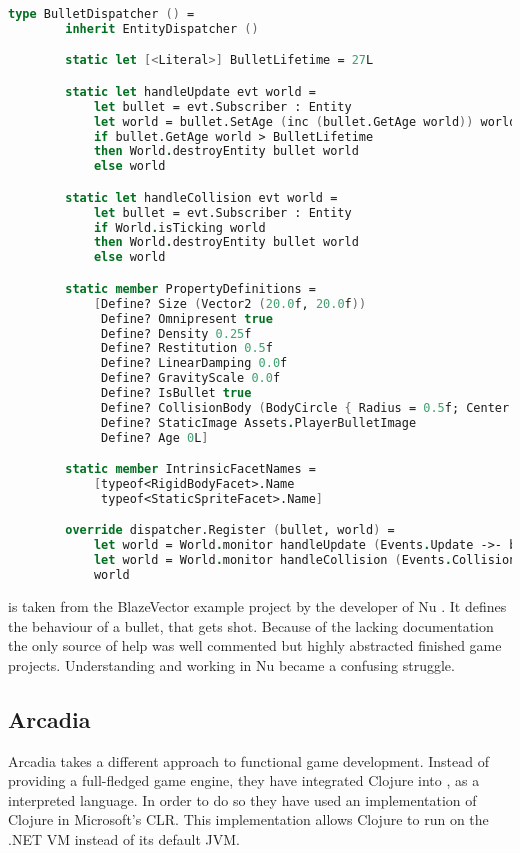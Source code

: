 \begin{lstlisting}[language=fsharp,label={lst:FSharp:Bullet},caption={F\# BulletDispatcher, as found in the BlazeVector game \cite{nu:blazevector}}]
type BulletDispatcher () =
        inherit EntityDispatcher ()

        static let [<Literal>] BulletLifetime = 27L

        static let handleUpdate evt world =
            let bullet = evt.Subscriber : Entity
            let world = bullet.SetAge (inc (bullet.GetAge world)) world
            if bullet.GetAge world > BulletLifetime
            then World.destroyEntity bullet world
            else world

        static let handleCollision evt world =
            let bullet = evt.Subscriber : Entity
            if World.isTicking world
            then World.destroyEntity bullet world
            else world

        static member PropertyDefinitions =
            [Define? Size (Vector2 (20.0f, 20.0f))
             Define? Omnipresent true
             Define? Density 0.25f
             Define? Restitution 0.5f
             Define? LinearDamping 0.0f
             Define? GravityScale 0.0f
             Define? IsBullet true
             Define? CollisionBody (BodyCircle { Radius = 0.5f; Center = Vector2.Zero })
             Define? StaticImage Assets.PlayerBulletImage
             Define? Age 0L]

        static member IntrinsicFacetNames =
            [typeof<RigidBodyFacet>.Name
             typeof<StaticSpriteFacet>.Name]

        override dispatcher.Register (bullet, world) =
            let world = World.monitor handleUpdate (Events.Update ->- bullet) bullet world
            let world = World.monitor handleCollision (Events.Collision ->- bullet) bullet world
            world
\end{lstlisting}
 is taken from the BlazeVector example project by the developer of Nu \cite{nu:blazevector}. It defines the behaviour of a bullet, that gets shot.
Because of the lacking documentation the only source of help was well commented but highly abstracted finished game projects. 
Understanding and working in Nu became a confusing struggle.

\subsection{Arcadia}
Arcadia takes a different approach to functional game development. Instead of providing a full-fledged game engine, they have integrated Clojure into \unityspace\cite{arcadia:github,arcadia:usage}, as a interpreted language. In order to do so they have used an implementation of Clojure in Microsoft's \ac{CLR}\cite{arcadia:clr}. This implementation allows Clojure to run on the .NET \ac{VM} instead of its default \ac{JVM}.

